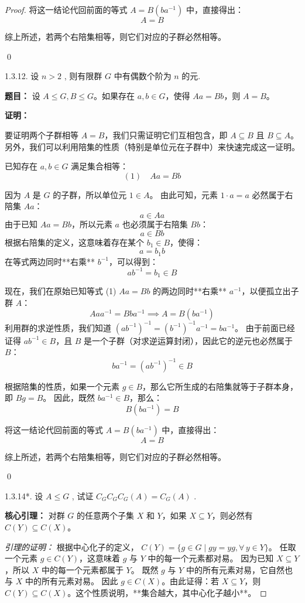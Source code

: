 \documentclass[]{article}
\begin{document}
\begin{proof}
将这一结论代回前面的等式 $A = B(ba^{-1})$ 中，直接得出：
\[ A = B \]

\bigskip
综上所述，若两个右陪集相等，则它们对应的子群必然相等。

\qed

1.3.12. 设 $n > 2$ , 则有限群 $G$ 中有偶数个阶为 $n$ 的元. 

\noindent \textbf{题目：} 设 $A \leqslant G, B \leqslant G$。如果存在 $a, b \in G$，使得 $Aa = Bb$，则 $A = B$。

\bigskip
\noindent \textbf{证明：} 

要证明两个子群相等 $A = B$，我们只需证明它们互相包含，即 $A \subseteq B$ 且 $B \subseteq A$。另外，我们可以利用陪集的性质（特别是单位元在子群中）来快速完成这一证明。

已知存在 $a, b \in G$ 满足集合相等：
\[ (1) \quad Aa = Bb \]

因为 $A$ 是 $G$ 的子群，所以单位元 $1 \in A$。
由此可知，元素 $1 \cdot a = a$ 必然属于右陪集 $Aa$：
\[ a \in Aa \]
由于已知 $Aa = Bb$，所以元素 $a$ 也必须属于右陪集 $Bb$：
\[ a \in Bb \]
根据右陪集的定义，这意味着存在某个 $b_1 \in B$，使得：
\[ a = b_1 b \]
在等式两边同时**右乘** $b^{-1}$，可以得到：
\[ ab^{-1} = b_1 \in B \]

现在，我们在原始已知等式 (1) $Aa = Bb$ 的两边同时**右乘** $a^{-1}$，以便孤立出子群 $A$：
\[ Aaa^{-1} = Bba^{-1} \implies A = B(ba^{-1}) \]
利用群的求逆性质，我们知道 $(ab^{-1})^{-1} = (b^{-1})^{-1}a^{-1} = ba^{-1}$。
由于前面已经证得 $ab^{-1} \in B$，且 $B$ 是一个子群（对求逆运算封闭），因此它的逆元也必然属于 $B$：
\[ ba^{-1} = (ab^{-1})^{-1} \in B \]

根据陪集的性质，如果一个元素 $g \in B$，那么它所生成的右陪集就等于子群本身，即 $Bg = B$。
因此，既然 $ba^{-1} \in B$，那么：
\[ B(ba^{-1}) = B \]

将这一结论代回前面的等式 $A = B(ba^{-1})$ 中，直接得出：
\[ A = B \]

\bigskip
综上所述，若两个右陪集相等，则它们对应的子群必然相等。

\qed

1.3.14*. 设 $A \leqslant G$ , 试证 $C_G C_G C_G(A) = C_G(A)$ . 

\bigskip
\noindent \textbf{核心引理：} 
对群 $G$ 的任意两个子集 $X$ 和 $Y$，如果 $X \subseteq Y$，则必然有 $C(Y) \subseteq C(X)$。

\noindent \textit{引理的证明：}
根据中心化子的定义， $C(Y) = \{ g \in G \mid gy = yg, \forall \, y \in Y \}$。
任取一个元素 $g \in C(Y)$，这意味着 $g$ 与 $Y$ 中的每一个元素都对易。
因为已知 $X \subseteq Y$，所以 $X$ 中的每一个元素都属于 $Y$。
既然 $g$ 与 $Y$ 中的所有元素对易，它自然也与 $X$ 中的所有元素对易。
因此 $g \in C(X)$。由此证得：若 $X \subseteq Y$，则 $C(Y) \subseteq C(X)$。这个性质说明，**集合越大，其中心化子越小**。


\end{proof}
\end{document}
